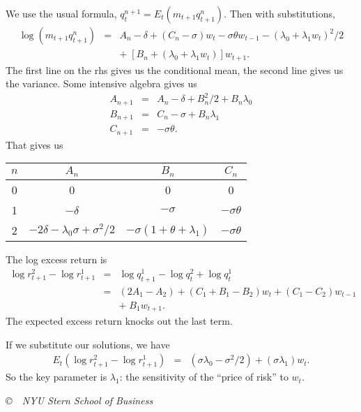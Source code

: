 \documentclass[11pt]{exam}
\begin{document}
\begin{questions}
\begin{solution}
\begin{parts}
\item We use the usual formula,
$ q^{n+1}_t = E_t (m_{t+1} q^n_{t+1})$.
Then with substitutions,
\begin{eqnarray*}
    \log (m_{t+1} q^n_{t+1}) &=& A_n - \delta + (C_n-\sigma) w_t - \sigma\theta w_{t-1}
            - (\lambda_0 + \lambda_1 w_t)^2/2 \\
            && + \; [B_n + (\lambda_0 + \lambda_1 w_t)] w_{t+1} .
\end{eqnarray*}
The first line on the rhs gives us the conditional mean, the second line gives us the variance.
Some intensive algebra gives us
\begin{eqnarray*}
    A_{n+1} &=& A_n - \delta + B_n^2/2 + B_n \lambda_0 \\
    B_{n+1} &=& C_n - \sigma + B_n \lambda_1 \\
    C_{n+1} &=& - \sigma \theta .
\end{eqnarray*}
That gives us
\begin{center}
\begin{tabular}{cccc}
$n$ & $A_n$ & $B_n$ & $C_n$ \\
\midrule
0 & 0 & 0 & 0 \\
1 & $-\delta$ & $-\sigma$ & $-\sigma \theta$ \\
2 & $- 2\delta -\lambda_0 \sigma + \sigma^2/2$ & $- \sigma (1+\theta+\lambda_1)$ & $-\sigma\theta$
\end{tabular}
\end{center}

\item The log excess return is
\begin{eqnarray*}
    \log r^2_{t+1} - \log r^1_{t+1} &=& \log q^1_{t+1} - \log q^2_t + \log q^1_t \\
            &=& (2 A_1 - A_2) + (C_1 + B_1 - B_2) w_t + (C_1 - C_2) w_{t-1} \\
            &&        + \; B_1 w_{t+1} .
\end{eqnarray*}
The expected excess return knocks out the last term.

If we substitute our solutions, we have
\begin{eqnarray*}
   E_t \left( \log r^2_{t+1} - \log r^1_{t+1}\right)
            &=& (\sigma \lambda_0 - \sigma^2/2)  + (\sigma\lambda_1) w_t  .
\end{eqnarray*}
So the key parameter is $\lambda_1$:  the sensitivity of the ``price of risk''
to $w_t$.
\end{parts}
\end{solution}

\end{questions}

\vfill \centerline{\it \copyright \ \number\year \
NYU Stern School of Business}
\end{document}
